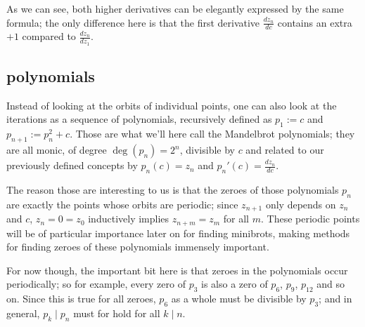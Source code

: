 \documentclass[12pt,a4paper]{article}
\begin{document}
As we can see, both higher derivatives can be elegantly expressed by the same formula; the only difference here is that the first derivative $\frac{dz_n}{dc}$ contains an extra $+1$ compared to $\frac{dz_n}{dz_1}$.

\subsection{polynomials}


Instead of looking at the orbits of individual points, one can also look at the iterations as a sequence of polynomials, recursively defined as $p_1:=c$ and $p_{n+1}:=p_n^2+c$. Those are what we'll here call the Mandelbrot polynomials; they are all monic, of degree $\deg(p_n)=2^n$, divisible by $c$ and related to our previously defined concepts by $p_n(c)=z_n$ and $p_n'(c)=\frac{dz_n}{dc}$.

The reason those are interesting to us is that the zeroes of those polynomials $p_n$ are exactly the points whose orbits are periodic; since $z_{n+1}$ only depends on $z_n$ and $c$, $z_n=0=z_0$ inductively implies $z_{n+m}=z_m$ for all $m$. These periodic points will be of particular importance later on for finding minibrots, making methods for finding zeroes of these polynomials immensely important.

For now though, the important bit here is that zeroes in the polynomials occur periodically; so for example, every zero of $p_3$ is also a zero of $p_6$, $p_9$, $p_{12}$ and so on. Since this is true for all zeroes, $p_6$ as a whole must be divisible by $p_3$; and in general, $p_k\mid p_n$ must for hold for all $k\mid n$.
\end{document}

